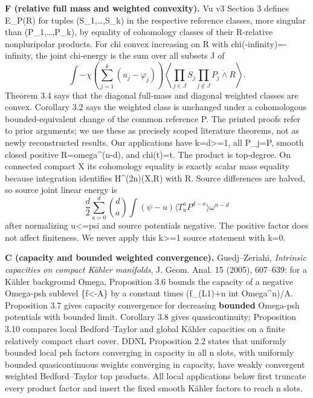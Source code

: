 \documentclass[
]{article}
\begin{document}
\textbf{F (relative full mass and weighted convexity).} Vu v3 Section 3
defines E\_P(R) for tuples (S\_1,\ldots,S\_k) in the respective
reference classes, more singular than (P\_1,\ldots,P\_k), by equality of
cohomology classes of their R-relative nonpluripolar products. For chi
convex increasing on R with chi(-infinity)=-infinity, the joint
chi-energy is the sum over all subsets J of \[
\int -\chi\!\left(\sum_{j=1}^k(u_j-\varphi_j)\right)
\left\langle\prod_{j\in J}S_j\prod_{j\notin J}P_j\mathbin{\dot\wedge}R\right\rangle.
\] Theorem 3.4 says that the diagonal full-mass and diagonal weighted
classes are convex. Corollary 3.2 says the weighted class is unchanged
under a cohomologous bounded-equivalent change of the common reference
P. The printed proofs refer to prior arguments; we use these as
precisely scoped literature theorems, not as newly reconstructed
results. Our applications have k=d\textgreater=1, all P\_j=P, smooth
closed positive R=omega\^{}(n-d), and chi(t)=t. The product is
top-degree. On connected compact X its cohomology equality is exactly
scalar mass equality because integration identifies H\^{}(2n)(X,R) with
R. Source differences are halved, so source joint linear energy is \[
\frac d2\sum_{a=0}^d\binom da
\int(\psi-u)\langle T_u^aP^{d-a}\rangle\omega^{n-d}
\] after normalizing u\textless=psi and source potentials negative. The
positive factor does not affect finiteness. We never apply this
k\textgreater=1 source statement with k=0.

\textbf{C (capacity and bounded weighted convergence).} Guedj--Zeriahi,
\emph{Intrinsic capacities on compact Kähler manifolds}, J. Geom. Anal.
15 (2005), 607--639: for a Kähler background Omega, Proposition 3.6
bounds the capacity of a negative Omega-psh sublevel \{f\textless-A\} by
a constant times (\textbar\textbar f\textbar\textbar\_(L1)+n int
Omega\^{}n)/A. Proposition 3.7 gives capacity convergence for decreasing
\textbf{bounded} Omega-psh potentials with bounded limit. Corollary 3.8
gives quasicontinuity; Proposition 3.10 compares local Bedford--Taylor
and global Kähler capacities on a finite relatively compact chart cover.
DDNL Proposition 2.2 states that uniformly bounded local psh factors
converging in capacity in all n slots, with uniformly bounded
quasicontinuous weights converging in capacity, have weakly convergent
weighted Bedford--Taylor top products. All local applications below
first truncate every product factor and insert the fixed smooth Kähler
factors to reach n slots.
\end{document}
